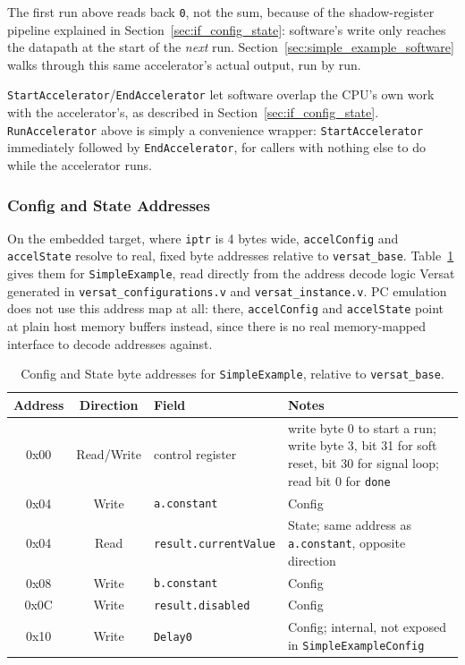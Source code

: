 The first run above reads back \texttt{0}, not the sum, because of the
shadow-register pipeline explained in Section~\ref{sec:if_config_state}:
software's write only reaches the datapath at the start of the
\emph{next} run. Section~\ref{sec:simple_example_software} walks through
this same accelerator's actual output, run by run.

\texttt{StartAccelerator}/\texttt{EndAccelerator} let software overlap the
CPU's own work with the accelerator's, as described in
Section~\ref{sec:if_config_state}. \texttt{RunAccelerator} above is simply
a convenience wrapper: \texttt{StartAccelerator} immediately followed by
\texttt{EndAccelerator}, for callers with nothing else to do while the
accelerator runs.

\subsubsection*{Config and State Addresses}

On the embedded target, where \texttt{iptr} is 4 bytes wide, \texttt{accelConfig} and \texttt{accelState} resolve to real, fixed byte addresses relative to \texttt{versat\_base}. Table~\ref{tab:simple_example_addrs} gives them for \texttt{SimpleExample}, read directly from the address decode logic Versat generated in \texttt{versat\_configurations.v} and \texttt{versat\_instance.v}. PC emulation does not use this address map at all: there, \texttt{accelConfig} and \texttt{accelState} point at plain host memory buffers instead, since there is no real memory-mapped interface to decode addresses against.

\begin{table}[H]
\centering
\begin{tabularx}{\textwidth}{|c|c|l|X|}
\hline
\rowcolor{iob-green}
\textbf{Address} & \textbf{Direction} & \textbf{Field} & \textbf{Notes} \\
\hline
\hline
0x00 & Read/Write & control register & write byte 0 to start a run; write byte 3, bit 31 for soft reset, bit 30 for signal loop; read bit 0 for \texttt{done} \\
\hline
0x04 & Write & \texttt{a.constant} & Config \\
\hline
0x04 & Read & \texttt{result.currentValue} & State; same address as \texttt{a.constant}, opposite direction \\
\hline
0x08 & Write & \texttt{b.constant} & Config \\
\hline
0x0C & Write & \texttt{result.disabled} & Config \\
\hline
0x10 & Write & \texttt{Delay0} & Config; internal, not exposed in \texttt{SimpleExampleConfig} \\
\hline
\end{tabularx}
\caption{Config and State byte addresses for \texttt{SimpleExample}, relative to \texttt{versat\_base}.}
\label{tab:simple_example_addrs}
\end{table}

